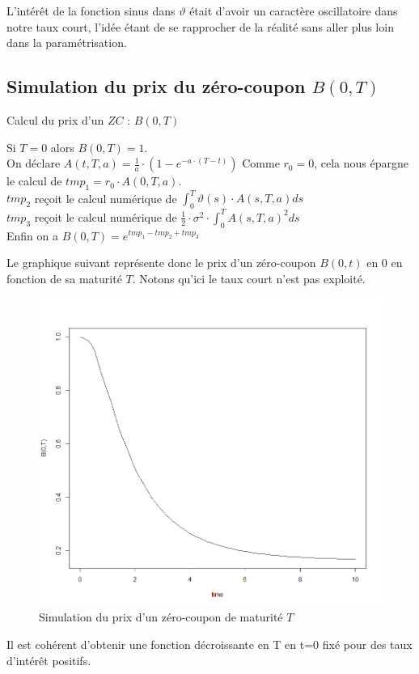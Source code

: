 \documentclass[11pt]{article}
\let\vega\vartheta
\begin{document}
\noindent L'intérêt de la fonction sinus dans $\vega$ était d'avoir un caractère oscillatoire dans notre taux court, l'idée étant de se rapprocher de la réalité sans aller plus loin dans la paramétrisation.

\subsection{Simulation du prix du zéro-coupon $B(0,T)$}
\begin{algorithm}[H]
\caption{Calcul du prix d'un $ZC$ : $B(0,T)$}
Si $T=0$ alors $B(0,T)=1$.\\
On déclare $A(t,T,a) = \frac{1}{a} \cdot (1 - e^{-a\cdot (T-t)})$
Comme $r_{0} = 0$,  cela nous épargne le calcul de $tmp_{1} = r_{0} \cdot A(0,T,a)$.\\
$tmp_{2}$ reçoit le calcul numérique de $\int^{T}_{0} \vega(s) \cdot A(s,T,a) ds$\\
$tmp_{3}$ reçoit le calcul numérique de $\frac{1}{2} \cdot \sigma^{2} \cdot \int^{T}_{0}A(s,T,a)^2ds$\\
Enfin on a $B(0,T)=e^{tmp_{1} - tmp_{2} + tmp_{3}}$
\end{algorithm}


Le graphique suivant représente donc le prix d'un zéro-coupon $B(0,t)$ en $0$ en fonction de sa maturité $T$. Notons qu'ici le taux court n'est pas exploité. 
\begin{figure}[H]
         \centering \includegraphics[scale=0.55]{0_C_en_0_de_mat_T}
        \caption{Simulation du prix d'un zéro-coupon de maturité $T$}
\end{figure}
Il est cohérent d'obtenir une fonction décroissante en T en t=0 fixé pour des taux d'intérêt positifs.
\end{document}
